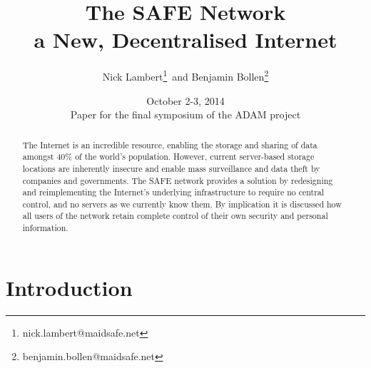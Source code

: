 \documentclass[twocolumn,english]{article}
\begin{document}
\title{The SAFE Network\\ a New, Decentralised Internet}
\date{October 2-3, 2014\\ Paper for the final symposium of the ADAM project}
\author{Nick Lambert\footnote{nick.lambert@maidsafe.net}\, and Benjamin Bollen\footnote{benjamin.bollen@maidsafe.net}}
\maketitle

\begin{abstract}
The Internet is an incredible resource, enabling the storage and sharing
of data amongst 40\% of the world\textquoteright s population. However,
current server-based storage locations are inherently insecure and enable mass surveillance
and data theft by companies and governments. 
The SAFE network provides a solution by redesigning and
reimplementing the Internet's underlying infrastructure
to require no central control, and no servers as we currently
know them. By implication it is discussed how all users of the
network retain complete control of their own security and
personal information.
\end{abstract}

\section{Introduction}
\end{document}
